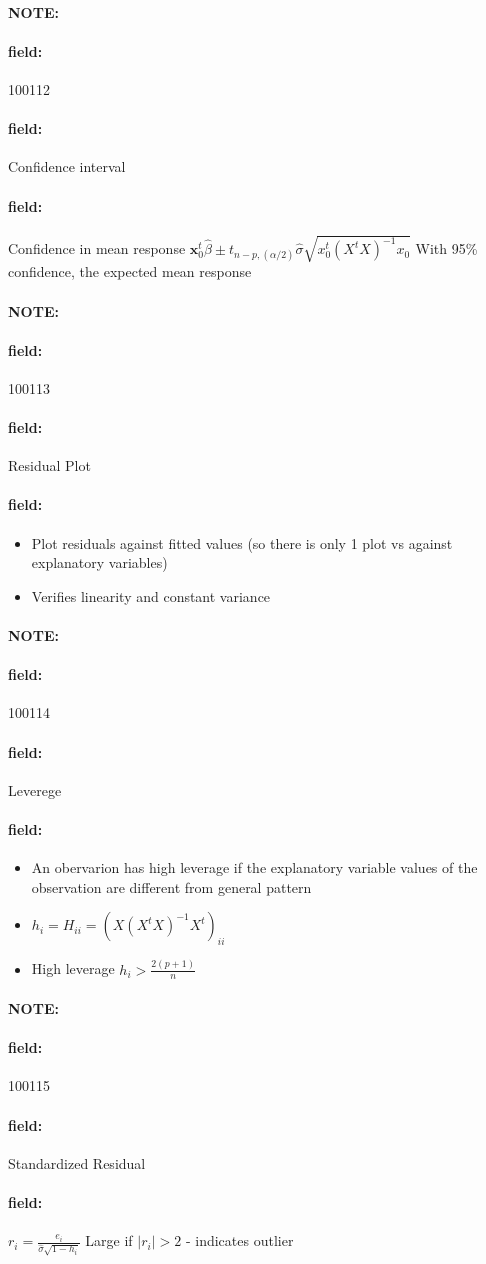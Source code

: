 \documentclass[12pt]{article}
\newenvironment{note}{\paragraph{NOTE:}}{}
\newenvironment{field}{\paragraph{field:}}{}
\begin{document}
\begin{note} \begin{field} \tiny 100112 \end{field}
 \begin{field}
  Confidence interval
 \end{field}
 \begin{field}
  Confidence in mean response $\mathbf{x}_0^t \hat{\beta} \pm t_{n-p,(\alpha/2)}\hat{\sigma} \sqrt{x_0^t(X^tX)^{-1}x_0}$
  With 95\% confidence, the expected mean response
 \end{field}
\end{note}


\begin{note} \begin{field} \tiny 100113 \end{field}
 \begin{field}
  Residual Plot
 \end{field}
 \begin{field}
  \begin{itemize}
   \item Plot residuals against fitted values (so there is only 1 plot vs against explanatory variables)
   \item Verifies linearity and constant variance
  \end{itemize}
 \end{field}
\end{note}

\begin{note} \begin{field} \tiny 100114 \end{field}
 \begin{field}
  Leverege
 \end{field}
 \begin{field}
  \begin{itemize}
   \item An obervarion has high leverage if the explanatory variable values of the observation are different from general pattern
   \item $h_i = H_{ii} = (X(X^tX)^{-1}X^t)_{ii}$
   \item High leverage $h_i > \frac{2(p+1)}{n}$
  \end{itemize}
 \end{field}
\end{note}

\begin{note} \begin{field} \tiny 100115 \end{field}
 \begin{field}
  Standardized Residual
 \end{field}
 \begin{field}
  $r_i = \frac{e_i}{\hat{\sigma}\sqrt{1 - h_i}}$
  Large if $|r_i| > 2$ - indicates outlier
 \end{field}
\end{note}
\end{document}
